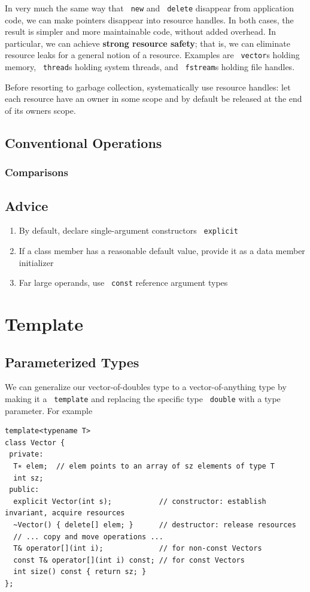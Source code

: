 \documentclass[11pt]{article}
\let\OldTexttt\texttt
\renewcommand{\texttt}[1]{\OldTexttt{\color{MidnightBlue} #1}}
\begin{document}
In very much the same way that \texttt{new} and \texttt{delete} disappear from application code, we can make
pointers disappear into resource handles. In both cases, the result is simpler and more
maintainable code, without added overhead. In particular, we can achieve \textbf{strong resource safety};
that is, we can eliminate resource leaks for a general notion of a resource. Examples are
\texttt{vector}s holding memory, \texttt{thread}s holding system threads, and \texttt{fstream}s
holding file handles.

Before resorting to garbage collection, systematically use resource handles: let each resource
have an owner in some scope and by default be released at the end of its owners scope.
\subsection{Conventional Operations}
\label{sec:org13b4096}
\subsubsection{Comparisons}
\label{sec:org22fdcf5}
\subsection{Advice}
\label{sec:orge493881}
\begin{enumerate}
\item By default, declare single-argument constructors \texttt{explicit}
\item If a class member has a reasonable default value, provide it as a data member initializer
\item Far large operands, use \texttt{const} reference argument types
\end{enumerate}
\section{Template}
\label{sec:org399579e}
\subsection{Parameterized Types}
\label{sec:org61b6938}
We can generalize our vector-of-doubles type to a vector-of-anything type by making it a
\texttt{template} and replacing the specific type \texttt{double} with a type parameter. For example
\begin{verbatim}
template<typename T>
class Vector {
 private:
  T∗ elem;  // elem points to an array of sz elements of type T
  int sz;
 public:
  explicit Vector(int s);           // constructor: establish invariant, acquire resources
  ~Vector() { delete[] elem; }      // destructor: release resources
  // ... copy and move operations ...
  T& operator[](int i);             // for non-const Vectors
  const T& operator[](int i) const; // for const Vectors
  int size() const { return sz; }
};
\end{verbatim}
\end{document}

